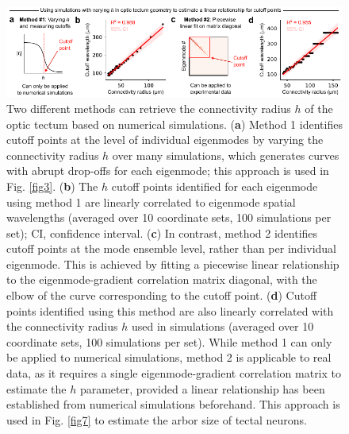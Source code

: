 \documentclass{article}
\begin{document}
\begin{figure}[t]
    \centering
    \includegraphics[width=1.0\linewidth]{figures/supp_tectum_cutoff.pdf}
    \caption{Two different methods can retrieve the connectivity radius $h$ of the optic tectum based on numerical simulations. (\textbf{a}) Method 1 identifies cutoff points at the level of individual eigenmodes by varying the connectivity radius $h$ over many simulations, which generates curves with abrupt drop-offs for each eigenmode; this approach is used in Fig. \ref{fig3}. (\textbf{b}) The $h$ cutoff points identified for each eigenmode using method 1 are linearly correlated to eigenmode spatial wavelengths (averaged over 10 coordinate sets, 100 simulations per set); CI, confidence interval. (\textbf{c}) In contrast, method 2 identifies cutoff points at the mode ensemble level, rather than per individual eigenmode. This is achieved by fitting a piecewise linear relationship to the eigenmode-gradient correlation matrix diagonal, with the elbow of the curve corresponding to the cutoff point. (\textbf{d}) Cutoff points identified using this method are also linearly correlated with the connectivity radius $h$ used in simulations (averaged over 10 coordinate sets, 100 simulations per set). While method 1 can only be applied to numerical simulations, method 2 is applicable to real data, as it requires a single eigenmode-gradient correlation matrix to estimate the $h$ parameter, provided a linear relationship has been established from numerical simulations beforehand. This approach is used in Fig. \ref{fig7} to estimate the arbor size of tectal neurons.}
    \label{supp_tectum_cutoff}
\end{figure}

\newpage
\end{document}
